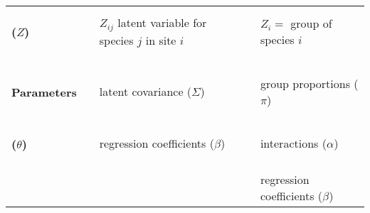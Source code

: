 {\begin{tabular}{p{}cp{}cp{}}
   \paragraph{($Z$)} 
   & &  $Z_{ij}$ latent variable for species $j$ in site $i$ 
   & &  $Z_i =$ group of species $i$ \\
   \\
   \hline \\
   \paragraph{Parameters} 
   & &  latent covariance ($\Sigma$) 
   & &  group proportions ($\pi$) \\ 
   \paragraph{($\theta$)} 
   & &  regression coefficients ($\beta$) 
   & &  interactions ($\alpha$) \\
   & & & & regression coefficients ($\beta$) \\
  \end{tabular}

}


